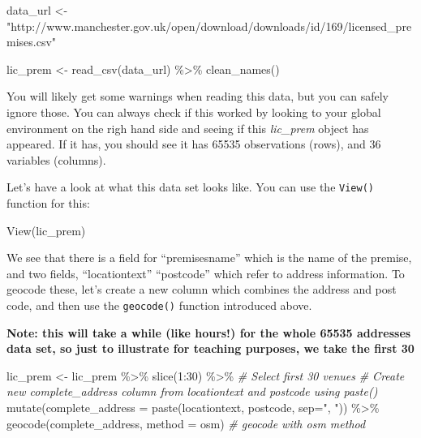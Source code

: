 \documentclass[
]{book}
\newenvironment{Shaded}{\begin{snugshade}}{\end{snugshade}}
\newcommand{\AttributeTok}[1]{\textcolor[rgb]{0.77,0.63,0.00}{#1}}
\newcommand{\CommentTok}[1]{\textcolor[rgb]{0.56,0.35,0.01}{\textit{#1}}}
\newcommand{\DecValTok}[1]{\textcolor[rgb]{0.00,0.00,0.81}{#1}}
\newcommand{\FunctionTok}[1]{\textcolor[rgb]{0.00,0.00,0.00}{#1}}
\newcommand{\NormalTok}[1]{#1}
\newcommand{\OtherTok}[1]{\textcolor[rgb]{0.56,0.35,0.01}{#1}}
\newcommand{\SpecialCharTok}[1]{\textcolor[rgb]{0.00,0.00,0.00}{#1}}
\newcommand{\StringTok}[1]{\textcolor[rgb]{0.31,0.60,0.02}{#1}}
\begin{document}
\begin{Shaded}
\begin{Highlighting}[]
\NormalTok{data\_url }\OtherTok{\textless{}{-}} \StringTok{"http://www.manchester.gov.uk/open/download/downloads/id/169/licensed\_premises.csv"}

\NormalTok{lic\_prem }\OtherTok{\textless{}{-}} \FunctionTok{read\_csv}\NormalTok{(data\_url) }\SpecialCharTok{\%\textgreater{}\%} 
  \FunctionTok{clean\_names}\NormalTok{()}
\end{Highlighting}
\end{Shaded}

You will likely get some warnings when reading this data, but you can safely ignore those. You can always check if this worked by looking to your global environment on the righ hand side and seeing if this \emph{lic\_prem} object has appeared. If it has, you should see it has 65535 observations (rows), and 36 variables (columns).

Let's have a look at what this data set looks like. You can use the \texttt{View()} function for this:

\begin{Shaded}
\begin{Highlighting}[]
\FunctionTok{View}\NormalTok{(lic\_prem)}
\end{Highlighting}
\end{Shaded}

We see that there is a field for ``premisesname'' which is the name of the premise, and two fields, ``locationtext'' ``postcode'' which refer to address information. To geocode these, let's create a new column which combines the address and post code, and then use the \texttt{geocode()} function introduced above.

\textbf{Note: this will take a while (like hours!) for the whole 65535 addresses data set, so just to illustrate for teaching purposes, we take the first 30}

\begin{Shaded}
\begin{Highlighting}[]
\NormalTok{lic\_prem }\OtherTok{\textless{}{-}}\NormalTok{ lic\_prem }\SpecialCharTok{\%\textgreater{}\%} 
  \FunctionTok{slice}\NormalTok{(}\DecValTok{1}\SpecialCharTok{:}\DecValTok{30}\NormalTok{) }\SpecialCharTok{\%\textgreater{}\%}    \CommentTok{\# Select first 30 venues}
  \CommentTok{\# Create new complete\_address column from locationtext and postcode using paste()}
  \FunctionTok{mutate}\NormalTok{(}\AttributeTok{complete\_address =} \FunctionTok{paste}\NormalTok{(locationtext, }
\NormalTok{                                  postcode, }
                                  \AttributeTok{sep=}\StringTok{", "}\NormalTok{)) }\SpecialCharTok{\%\textgreater{}\%}     
  \FunctionTok{geocode}\NormalTok{(complete\_address, }\AttributeTok{method =} \StringTok{\textquotesingle{}osm\textquotesingle{}}\NormalTok{)  }\CommentTok{\# geocode with osm method}
\end{Highlighting}
\end{Shaded}
\end{document}
